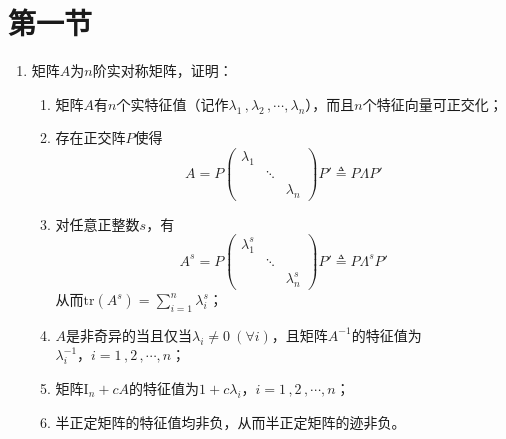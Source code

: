 \documentclass[10pt]{article}
\theoremstyle{definition}
\theoremstyle{definition}
\begin{document}
\maketitle

\newpage

\section{第一节}

\begin{enumerate}
    \item	%
        矩阵$A$为$n$阶实对称矩阵，证明：

        \begin{enumerate}[label=(\roman*), start=3]
            \item
                矩阵$A$有$n$个实特征值（记作$\lambda_1\, ,\lambda_2\, ,\cdots ,\lambda_n$），而且$n$个特征向量可正交化；
            \item
                存在正交阵$P$使得
                \begin{equation*}
                    A = P
                    \begin{pmatrix}
                        \lambda_1 & & \\
                                  & \ddots & \\
                                  & & \lambda_n
                    \end{pmatrix}
                    P' \triangleq P\Lambda P'
                \end{equation*}
            \item
                对任意正整数$s$，有
                \begin{equation*}
                    A^s = P
                    \begin{pmatrix}
                        \lambda_1^s & & \\
                                    & \ddots & \\
                                    & & \lambda_n^s
                    \end{pmatrix}
                    P' \triangleq P\Lambda^s P'
                \end{equation*}
                从而$\mathrm{tr}(A^s)=\sum_{i=1}^{n}\lambda_i^s$；
            \item
                $A$是非奇异的当且仅当$\lambda_i \ne 0\ (\forall i)$，且矩阵$A^{-1}$的特征值为$\lambda_i^{-1}\text{，}i=1\, ,2\, ,\cdots ,n$；
            \item
                矩阵$\mathrm{I}_n+cA$的特征值为$1+c\lambda_i\text{，}i=1\, ,2\, ,\cdots ,n$；
            \item
                半正定矩阵的特征值均非负，从而半正定矩阵的迹非负。
        \end{enumerate}


\end{enumerate}
\end{document}

